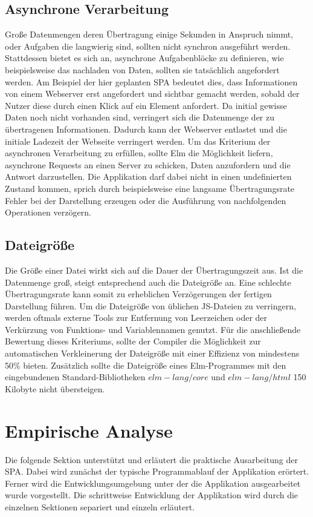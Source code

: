\subsection{Asynchrone Verarbeitung}
\label{sec:Asynchrone Verarbeitung}
Große Datenmengen deren Übertragung einige Sekunden in Anspruch nimmt, oder Aufgaben die langwierig sind, sollten nicht synchron ausgeführt werden. Stattdessen bietet es sich an, asynchrone Aufgabenblöcke zu definieren, wie beispielsweise das nachladen von Daten, sollten sie tatsächlich angefordert werden. Am Beispiel der hier geplanten \ac{SPA} bedeutet dies, dass Informationen von einem Webserver erst angefordert und sichtbar gemacht werden, sobald der Nutzer diese durch einen Klick auf ein Element anfordert. Da initial gewisse Daten noch nicht vorhanden sind, verringert sich die Datenmenge der zu übertragenen Informationen. Dadurch kann der Webserver entlastet und die initiale Ladezeit der Webseite verringert werden. Um das Kriterium der asynchronen Verarbeitung zu erfüllen, sollte Elm die Möglichkeit liefern, asynchrone Requests an einen Server zu schicken, Daten anzufordern und die Antwort darzustellen. Die Applikation darf dabei nicht in einen undefinierten Zustand kommen, sprich durch beispielsweise eine langsame Übertragungsrate Fehler bei der Darstellung erzeugen oder die Ausführung von nachfolgenden Operationen verzögern.


\subsection{Dateigröße}
\label{sec:Dateigroesse}
Die Größe einer Datei wirkt sich auf die Dauer der Übertragungszeit aus. Ist die Datenmenge groß, steigt entsprechend auch die Dateigröße an. Eine schlechte Übertragungsrate kann somit zu erheblichen Verzögerungen der fertigen Darstellung führen. Um die Dateigröße von üblichen \ac{JS}-Dateien zu verringern, werden oftmals externe Tools zur Entfernung von Leerzeichen oder der Verkürzung von Funktions- und Variablennamen genutzt. Für die anschließende Bewertung dieses Kriteriums, sollte der Compiler die Möglichkeit zur automatischen Verkleinerung der Dateigröße mit einer Effizienz von mindestens 50\% bieten. Zusätzlich sollte die Dateigröße eines Elm-Programmes mit den eingebundenen Standard-Bibliotheken $elm-lang/core$ und $elm-lang/html$ 150 Kilobyte nicht übersteigen.


\section{Empirische Analyse}
\label{sec:Empirische Analyse}
Die folgende Sektion unterstützt und erläutert die praktische Ausarbeitung der \ac{SPA}. Dabei wird zunächst der typische Programmablauf der Applikation erörtert. Ferner wird die Entwicklungsumgebung unter der die Applikation ausgearbeitet wurde vorgestellt. Die schrittweise Entwicklung der Applikation wird durch die einzelnen Sektionen separiert und einzeln erläutert.

